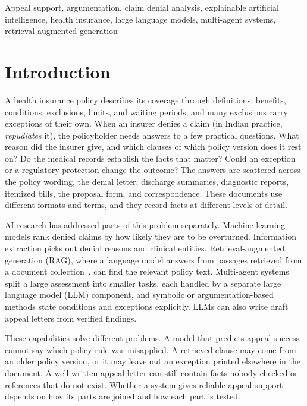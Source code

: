 \documentclass[conference]{IEEEtran}
\begin{document}
\begin{IEEEkeywords}
Appeal support, argumentation, claim denial analysis, explainable artificial intelligence, health insurance, large language models, multi-agent systems, retrieval-augmented generation
\end{IEEEkeywords}

\section{Introduction}
\label{sec:intro}
A health insurance policy describes its coverage through definitions, benefits, conditions, exclusions, limits, and waiting periods, and many exclusions carry exceptions of their own. When an insurer denies a claim (in Indian practice, \emph{repudiates} it), the policyholder needs answers to a few practical questions. What reason did the insurer give, and which clauses of which policy version does it rest on? Do the medical records establish the facts that matter? Could an exception or a regulatory protection change the outcome? The answers are scattered across the policy wording, the denial letter, discharge summaries, diagnostic reports, itemized bills, the proposal form, and correspondence. These documents use different formats and terms, and they record facts at different levels of detail.

AI research has addressed parts of this problem separately. Machine-learning models rank denied claims by how likely they are to be overturned. Information extraction picks out denial reasons and clinical entities. Retrieval-augmented generation (RAG), where a language model answers from passages retrieved from a document collection~\cite{lewis2020}, can find the relevant policy text. Multi-agent systems split a large assessment into smaller tasks, each handled by a separate large language model (LLM) component, and symbolic or argumentation-based methods state conditions and exceptions explicitly. LLMs can also write draft appeal letters from verified findings.

These capabilities solve different problems. A model that predicts appeal success cannot say which policy rule was misapplied. A retrieved clause may come from an older policy version, or it may leave out an exception printed elsewhere in the document. A well-written appeal letter can still contain facts nobody checked or references that do not exist. Whether a system gives reliable appeal support depends on how its parts are joined and how each part is tested.
\end{document}
